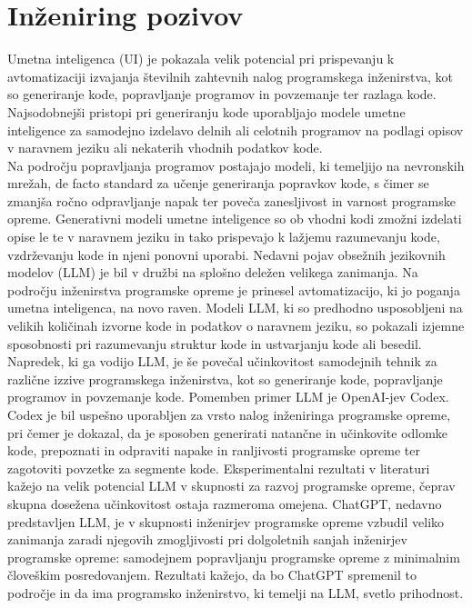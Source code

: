 \documentclass[a4paper,12pt,openright]{book}
\begin{document}
\section{Inženiring pozivov}

Umetna inteligenca (UI) je pokazala velik potencial pri prispevanju k avtomatizaciji izvajanja številnih zahtevnih nalog programskega inženirstva, kot so generiranje kode, popravljanje programov in povzemanje ter razlaga kode. \cite{bavishi2019autopandas} Najsodobnejši pristopi pri generiranju kode uporabljajo modele umetne inteligence za samodejno izdelavo delnih ali celotnih programov na podlagi opisov v naravnem jeziku ali nekaterih vhodnih podatkov kode. \cite{Chen2021EvaluatingLL}\\
Na področju popravljanja programov postajajo modeli, ki temeljijo na nevronskih mrežah, de facto standard za učenje generiranja popravkov kode, s čimer se zmanjša ročno odpravljanje napak ter poveča zanesljivost in varnost programske opreme. Generativni modeli umetne inteligence so ob vhodni kodi zmožni izdelati opise le te v naravnem jeziku in tako prispevajo k lažjemu razumevanju kode, vzdrževanju kode in njeni ponovni uporabi. Nedavni pojav obsežnih jezikovnih modelov (LLM) je bil v družbi na splošno deležen velikega zanimanja. Na področju inženirstva programske opreme je prinesel avtomatizacijo, ki jo poganja umetna inteligenca, na novo raven. Modeli LLM, ki so predhodno usposobljeni na velikih količinah izvorne kode in podatkov o naravnem jeziku, so pokazali izjemne sposobnosti pri razumevanju struktur kode in ustvarjanju kode ali besedil. Napredek, ki ga vodijo LLM, je še povečal učinkovitost samodejnih tehnik za različne izzive programskega inženirstva, kot so generiranje kode, popravljanje programov in povzemanje kode. \cite{wan2018improving}Pomemben primer LLM je OpenAI-jev Codex. Codex je bil uspešno uporabljen za vrsto nalog inženiringa programske opreme, pri čemer je dokazal, da je sposoben generirati natančne in učinkovite odlomke kode, prepoznati in odpraviti napake in ranljivosti programske opreme ter zagotoviti povzetke za segmente kode. \cite{vaithilingam2022expectation} Eksperimentalni rezultati v literaturi kažejo na velik potencial LLM v skupnosti za razvoj programske opreme, čeprav skupna dosežena učinkovitost ostaja razmeroma omejena. ChatGPT, nedavno predstavljen LLM, je v skupnosti inženirjev programske opreme vzbudil veliko zanimanja zaradi njegovih zmogljivosti pri dolgoletnih sanjah inženirjev programske opreme: samodejnem popravljanju programske opreme z minimalnim človeškim posredovanjem. Rezultati kažejo, da bo ChatGPT spremenil to področje in da ima programsko inženirstvo, ki temelji na LLM, svetlo prihodnost. 
 \cite{tian2023chatgptultimateprogrammingassistant}
\end{document}
